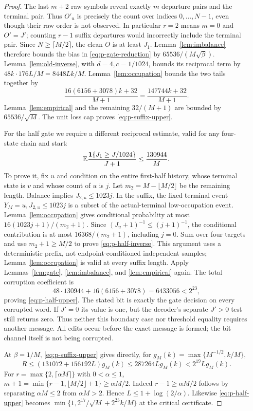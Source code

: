 \begin{proof}
The last $m+2$ raw symbols reveal exactly $m$ departure pairs and the
terminal pair.  Thus $O'_u$ is precisely the count over indices
$0,\ldots,N-1$, even though their raw order is not observed.
In particular $r=2$ means $m=0$ and $O'=J'$; counting $r-1$ suffix
departures would incorrectly include the terminal pair.
Since $N\ge\lceil M/2\rceil$, the clean $O$ is at least $J_1$.
Lemma~\ref{lem:imbalance} therefore bounds the bias in
\eqref{eq:p-gate-reduction} by $65536/(M\sqrt\beta)$.
Lemma~\ref{lem:old-inverse}, with $d=4,c=1/1024$, bounds its reciprocal
term by $48k\cdot176L/M=8448Lk/M$.
Lemma~\ref{lem:occupation} bounds the two tails together by
\[
 \frac{16(6156+3078)k+32}{M+1}
 =\frac{147744k+32}{M+1}.
\]
Lemma~\ref{lem:empirical} and the remaining $32/(M+1)$ are bounded by
$65536/\sqrt M$.  The unit loss cap proves \eqref{eq:p-suffix-upper}.

For the half gate we require a different reciprocal estimate, valid for
any four-state chain and start:
\begin{equation}\label{eq:p-half-inverse}
 \mathbb E\frac{\mathbf1\{J_1\ge J/1024\}}{J+1}\le\frac{130944}{M}.
\end{equation}
To prove it, fix $u$ and condition on the entire first-half history,
whose terminal state is $v$ and whose count of $u$ is $j$.
Let $m_2=M-\lfloor M/2\rfloor$ be the remaining length.  Balance implies
$J_{2,u}\le1023j$.  In the suffix, the fixed-terminal event
$Y_M=u,J_{2,u}\le1023j$ is a subset of the actual-terminal low-occupation
event.  Lemma~\ref{lem:occupation} gives conditional probability at most
$16(1023j+1)/(m_2+1)$.  Since $(J_u+1)^{-1}\le(j+1)^{-1}$,
the conditional contribution is at most $16368/(m_2+1)$, including $j=0$.
Sum over four targets and use $m_2+1\ge M/2$ to prove
\eqref{eq:p-half-inverse}.  This argument uses a deterministic prefix,
not endpoint-conditioned independent samples; Lemma~\ref{lem:occupation}
is valid at every suffix length.
Apply Lemmas~\ref{lem:gate}, \ref{lem:imbalance}, and
\ref{lem:empirical} again.  The total corruption coefficient is
\[
 48\cdot130944+16(6156+3078)=6433056<2^{23},
\]
proving \eqref{eq:p-half-upper}.
The stated bit is exactly the gate decision on every corrupted word.
If $J'=0$ its value is one, but the decoder's separate $J'>0$ test still
returns zero.  Thus neither this boundary case nor threshold equality
requires another message.  All edits occur before the exact message is
formed; the bit channel itself is not being corrupted.

At $\beta=1/M$, \eqref{eq:p-suffix-upper} gives directly, for
$g_M(k)=\max\{M^{-1/2},k/M\}$,
\[
 R\le(131072+156192L)g_M(k)
 \le287264L g_M(k)<2^{19}L g_M(k).
\]
For $r=\max\{2,\lceil\alpha M\rceil\}$ with $0<\alpha\le1$,
$m+1=\min\{r-1,\lfloor M/2\rfloor+1\}\ge\alpha M/2$.
Indeed $r-1\ge\alpha M/2$ follows by separating $\alpha M\le2$
from $\alpha M>2$.  Hence $L\le1+\log(2/\alpha)$.
Likewise \eqref{eq:p-half-upper} becomes
$\min\{1,2^{17}/\sqrt M+2^{23}k/M\}$ at the critical certificate.
\end{proof}

